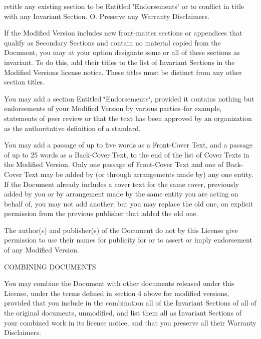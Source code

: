 retitle any existing section to be Entitled \char`\"{}\+Endorsements\char`\"{} or to conflict in title with any Invariant Section. O. Preserve any Warranty Disclaimers.

If the Modified Version includes new front-\/matter sections or appendices that qualify as Secondary Sections and contain no material copied from the Document, you may at your option designate some or all of these sections as invariant. To do this, add their titles to the list of Invariant Sections in the Modified Version\textquotesingle{}s license notice. These titles must be distinct from any other section titles.

You may add a section Entitled \char`\"{}\+Endorsements\char`\"{}, provided it contains nothing but endorsements of your Modified Version by various parties--for example, statements of peer review or that the text has been approved by an organization as the authoritative definition of a standard.

You may add a passage of up to five words as a Front-\/\+Cover Text, and a passage of up to 25 words as a Back-\/\+Cover Text, to the end of the list of Cover Texts in the Modified Version. Only one passage of Front-\/\+Cover Text and one of Back-\/\+Cover Text may be added by (or through arrangements made by) any one entity. If the Document already includes a cover text for the same cover, previously added by you or by arrangement made by the same entity you are acting on behalf of, you may not add another; but you may replace the old one, on explicit permission from the previous publisher that added the old one.

The author(s) and publisher(s) of the Document do not by this License give permission to use their names for publicity for or to assert or imply endorsement of any Modified Version.


\begin{DoxyEnumerate}
\item C\+O\+M\+B\+I\+N\+I\+NG D\+O\+C\+U\+M\+E\+N\+TS
\end{DoxyEnumerate}

You may combine the Document with other documents released under this License, under the terms defined in section 4 above for modified versions, provided that you include in the combination all of the Invariant Sections of all of the original documents, unmodified, and list them all as Invariant Sections of your combined work in its license notice, and that you preserve all their Warranty Disclaimers.


